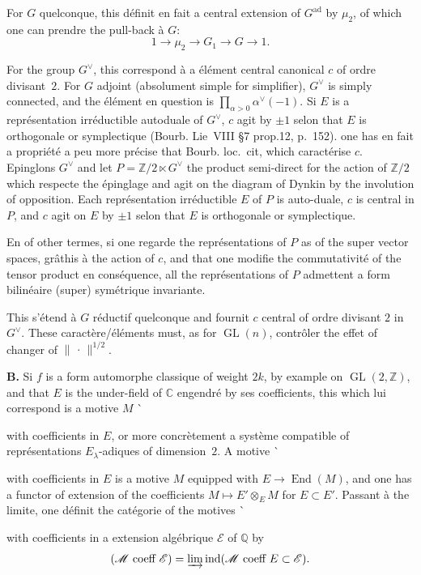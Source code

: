 \documentclass[11pt,a4paper]{article}
\theoremstyle{plain}
\theoremstyle{definition}
\DeclareMathOperator{\End}{End}
\DeclareMathOperator{\ind}{ind}
\DeclareMathOperator{\GL}{GL}
\newcommand{\norm}[1]{\lVert#1\rVert}
\begin{document}
{{{For $G$ quelconque, this d\'{e}finit en fait a central extension of $G^{\mathrm{ad}}$ by $\mu_2$, of which one can prendre the pull-back \`{a} $G$:
\[
1 \to \mu_2 \to G_1 \to G \to 1.
\]

For the group $G^\vee$, this correspond \`{a} a \'{e}l\'{e}ment central canonical $c$ of ordre divisant~$2$. For $G$ adjoint (absolument simple for simplifier), $G^\vee$ is simply connected, and the \'{e}l\'{e}ment en question is $\prod\limits_{\alpha>0} \alpha^\vee(-1)$. Si $E$ is a repr\'{e}sentation irr\'{e}ductible autoduale of $G^\vee$, $c$ agit by $\pm 1$ selon that $E$ is orthogonale or symplectique (Bourb. Lie~VIII \S7 prop.12, p.~152). one has en fait a propri\'{e}t\'{e} a peu more pr\'{e}cise that Bourb. loc.~cit, which caract\'{e}rise $c$. Epinglons $G^\vee$ and let $P = \mathbb Z/2 \ltimes G^\vee$ the product semi-direct for the action of $\mathbb Z/2$ which respecte the \'{e}pinglage and agit on the diagram of Dynkin by the involution of opposition. Each repr\'{e}sentation irr\'{e}ductible $E$ of $P$ is auto-duale, $c$ is central in $P$, and $c$ agit on $E$ by $\pm 1$ selon that $E$ is orthogonale or symplectique.

En of other termes, si one regarde the repr\'{e}sentations of $P$ as of the super vector spaces, gr\^{a}this \`{a} the action of $c$, and that one modifie the commutativit\'{e} of the tensor product en cons\'{e}quence, all the repr\'{e}sentations of $P$ admettent a form bilin\'{e}aire (super) sym\'{e}trique invariante.

This s'\'{e}tend \`{a} $G$ r\'{e}ductif quelconque and fournit $c$ central of ordre divisant $2$ in $G^\vee$. These caract\`{e}re/\'{e}l\'{e}ments must, as for $\GL(n)$, contr\^{o}ler the effet of changer of $\norm{\,\cdot\,}^{1/2}$.

\bigskip
\noindent \textbf{B.} Si $f$ is a form automorphe classique of weight $2k$, by example on $\GL(2,\mathbb Z)$, and that $E$ is the under-field of $\mathbb C$ engendr\'{e} by ses coefficients, this which lui correspond is a motive $M$ \`{with coefficients in $E$, or more concr\`{e}tement a syst\`{e}me compatible of repr\'{e}sentations $E_\lambda$-adiques of dimension~$2$. A motive \`{with coefficients in $E$ is a motive $M$ equipped with $E \to \End(M)$, and one has a functor of extension of the coefficients $M \mapsto E' \otimes_E M$ for $E \subset E'$. Passant \`{a} the limite, one d\'{e}finit the cat\'{e}gorie of the motives \`{with coefficients in a extension alg\'{e}brique $\mathcal E$ of $\mathbb Q$ by
\[
(\mathcal M \text{ coeff } \mathcal E) = \varinjlim \ind(\mathcal M \text{ coeff } E \subset \mathcal E).
\]

}}}}}}
\end{document}
